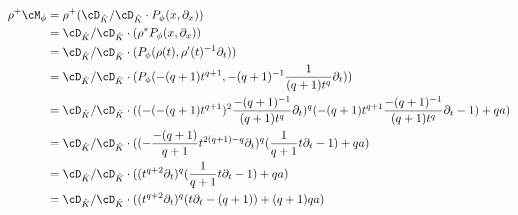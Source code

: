 \begin{align*}
\rho^+\cM_\phi &= \rho^+(\cD_{\hat K}/\cD_{\hat K}\cdot P_\phi(x,\partial_x))\\
  &=\cD_{\hat K}/\cD_{\hat K}\cdot(\rho^*P_\phi(x,\partial_x))\\
  &=\cD_{\hat K}/\cD_{\hat K}\cdot(P_\phi(\rho(t),\rho'(t)^{-1}\partial_t))\\
  &=\cD_{\hat K}/\cD_{\hat K}
    \cdot(P_\phi(-(q+1) t^{q+1},-(q+1)^{-1}\frac{1}{(q+1)t^q}\partial_t))\\
  &=\cD_{\hat K}/\cD_{\hat K} \cdot
    ((-(-(q+1) t^{q+1})^2\frac{-(q+1)^{-1}}{(q+1)t^{q}}\partial_t)^{q}
    (-(q+1) t^{q+1}\frac{-(q+1)^{-1}}{(q+1)t^{q}}\partial_t-1)+qa)\\
  &=\cD_{\hat K}/\cD_{\hat K}
    \cdot((-\frac{-(q+1)}{q+1}t^{2(q+1)-q}\partial_t)^{q}
    (\frac{1}{q+1}t\partial_t-1)+qa)\\
  &=\cD_{\hat K}/\cD_{\hat K}
    \cdot((t^{q+2}\partial_t)^{q}
    (\frac{1}{q+1}t\partial_t-1)+qa)\\
  &=\cD_{\hat K}/\cD_{\hat K}
    \cdot((t^{q+2}\partial_t)^{q}
    (t\partial_t-(q+1))+(q+1)qa)
\end{align*}
\begin{comment}
Bei \cite{sabbah_Fourier-local}:\\
Sei $\rho:t\mapsto x:=-\frac{t^{q+1}}{qa}$ so ist
\begin{align*}
\rho^+\cM_\phi &= \rho^+(\cD_{\hat K}/\cD_{\hat K}\cdot P_\phi(x,\partial_x))\\
  &=\cD_{\hat K}/\cD_{\hat K}\cdot(\rho^*P_\phi(x,\partial_x))\\
  &=\cD_{\hat K}/\cD_{\hat K}\cdot(P_\phi(\rho(t),\rho'(t)^{-1}\partial_t))\\
  &=\cD_{\hat K}/\cD_{\hat K}
    \cdot(P_\phi(-\frac{t^{q+1}}{qa}, -\frac{qa}{(q+1)t^q}\partial_t))
\end{align*}
mit
\begin{align*}
P_\phi(-\frac{t^{q+1}}{qa}, -\frac{qa}{(q+1)t^q}\partial_t)
  &= (-(-\frac{t^{q+1}}{qa})^2(-\frac{qa}{(q+1)t^q}\partial_t))^q
    (-\frac{t^{q+1}}{qa}(-\frac{qa}{(q+1)t^q}\partial_t)-1)+qa\\
  &= ((\frac{t^{q+1}}{qa})^2\frac{qa}{(q+1)t^q}\partial_t)^q
    (\frac{t^{q+1}}{qa}\frac{qa}{(q+1)t^q}\partial_t-1)+qa\\
  &= (\frac{(t^{q+1})^2}{qa(q+1)t^q}\partial_t)^q
    (\frac{t^{q+1}}{(q+1)t^q}\partial_t-1)+qa\\
  &= (\frac{t^{2q+2-q}}{qa(q+1)}\partial_t)^q
    (\frac{t^{q+1-q}}{(q+1)}\partial_t-1)+qa\\
  &= (\frac{t^{q+2}}{qa(q+1)}\partial_t)^q
    (\frac{1}{(q+1)}t\partial_t-1)+qa\\
\end{align*}
\end{comment}
